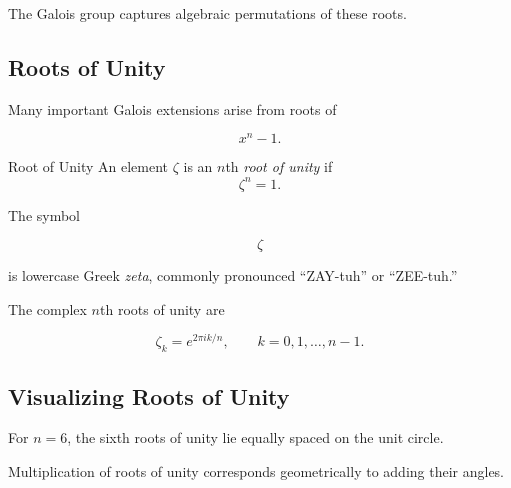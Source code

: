 The Galois group captures algebraic permutations of these roots.

\subsection{Roots of Unity}
\label{subsec:roots-of-unity}

Many important Galois extensions arise from roots of

\[ x^n-1. \]

\begin{definitionbox}{Root of Unity}
An element \(\zeta\) is an \(n\)th \emph{root of unity} if
\[ \zeta^n=1. \]
\end{definitionbox}

The symbol

\[ \zeta \]

is lowercase Greek \emph{zeta}, commonly pronounced ``ZAY-tuh'' or
``ZEE-tuh.''

The complex \(n\)th roots of unity are

\[ \zeta_k=e^{2\pi ik/n},\qquad k=0,1,\ldots,n-1. \]

\subsection{Visualizing Roots of Unity}
\label{subsec:visual-roots-unity}

For \(n=6\), the sixth roots of unity lie equally spaced on the unit circle.

\begin{center}
\end{center}

Multiplication of roots of unity corresponds geometrically to adding their
angles.

